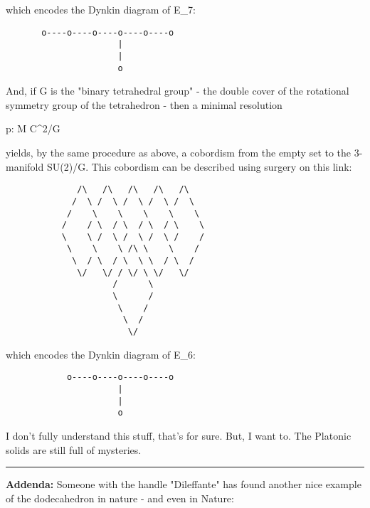 which encodes the Dynkin diagram of E_{7}:

\begin{verbatim}
       o----o----o----o----o----o
                      |
                      |
                      o
\end{verbatim}
    

And, if G is the "binary tetrahedral group" - the double
cover of the rotational symmetry group of the tetrahedron - then a
minimal resolution

p: M \to  C^{2}/G

yields, by the same procedure as above, a cobordism from the 
empty set to the 3-manifold SU(2)/G.  This cobordism can be 
described using surgery on this link:


\begin{verbatim}
              /\   /\   /\   /\   /\ 
             /  \ /  \ /  \ /  \ /  \
            /    \    \    \    \    \   
           /    / \  / \  / \  / \    \ 
           \    \ /  \ /  \ /  \ /    / 
            \    \    \ /\ \    \    /
             \  / \  / \  \ \  / \  /
              \/   \/ / \/ \ \/   \/
                     /      \ 
                     \      /
                      \    /
                       \  /
                        \/ 
\end{verbatim}
    
which encodes the Dynkin diagram of E_{6}:


\begin{verbatim}
            o----o----o----o----o
                      |
                      |
                      o

\end{verbatim}
    
I don't fully understand this stuff, that's for sure.  But, I 
want to.  The Platonic solids are still full of mysteries.  

\par\noindent\rule{\textwidth}{0.4pt}

\textbf{Addenda:} Someone with the handle "Dileffante" has
found another nice example of the dodecahedron in nature - and even
in Nature:




